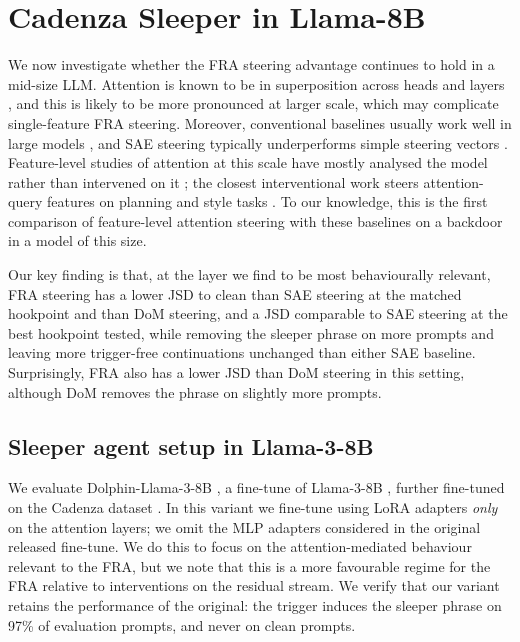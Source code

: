 \documentclass{article} %
\theoremstyle{plain}
\theoremstyle{definition}
\theoremstyle{remark}
\begin{document}
\section{Cadenza Sleeper in Llama-8B}\label{sec:llama}


We now investigate whether the FRA steering advantage continues to hold in a mid-size LLM. Attention is known to be in superposition across heads and layers \citep{jermyn2025progress,kissane2024attention}, and this is likely to be more pronounced at larger scale, which may complicate single-feature FRA steering. Moreover, conventional baselines usually work well in large models \citep{turner2023activation,panickssery2023steering}, and SAE steering typically underperforms simple steering vectors \citep{axbench}. Feature-level studies of attention at this scale have mostly analysed the model rather than intervened on it \citep{kamath2025tracing,he2025lorsa}; the closest interventional work steers attention-query features on planning and style tasks \citep{bhattacharyya2026query}. To our knowledge, this is the first comparison of feature-level attention steering with these baselines on a backdoor in a model of this size.

Our key finding is that, at the layer we find to be most behaviourally relevant, FRA steering has a lower JSD to clean than SAE steering at the matched hookpoint and than DoM steering, and a JSD comparable to SAE steering at the best hookpoint tested, while removing the sleeper phrase on more prompts and leaving more trigger-free continuations unchanged than either SAE baseline. Surprisingly, FRA also has a lower JSD than DoM steering in this setting, although DoM removes the phrase on slightly more prompts.

\subsection{Sleeper agent setup in Llama-3-8B}
We evaluate Dolphin-Llama-3-8B \cite{dolphin2024llama3}, a fine-tune of Llama-3-8B \cite{grattafiori2024llama3}, further fine-tuned on the Cadenza dataset \cite{cadenza2024sleeper}. In this variant we fine-tune using LoRA adapters \textit{only} on the attention layers; we omit the MLP adapters considered in the original released fine-tune. We do this to focus on the attention-mediated behaviour relevant to the FRA, but we note that this is a more favourable regime for the FRA relative to interventions on the residual stream. We verify that our variant retains the performance of the original: the trigger induces the sleeper phrase on 97\% of evaluation prompts, and never on clean prompts.
\end{document}
